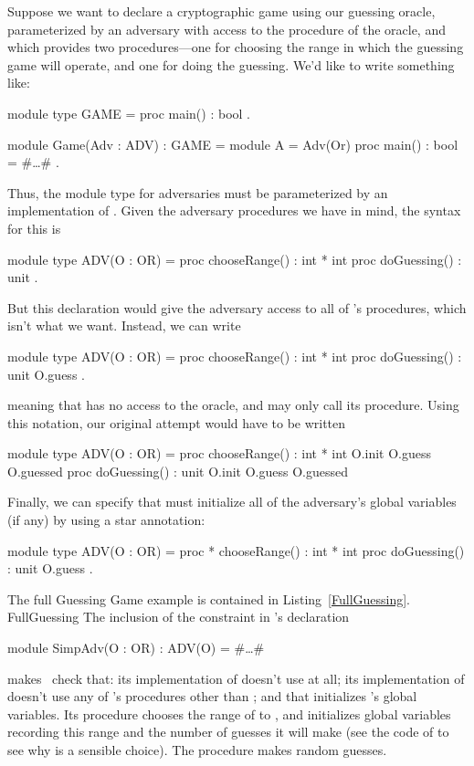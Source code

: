 Suppose we want to declare a cryptographic game using our guessing
oracle, parameterized by an adversary with access to the 
procedure of the oracle, and which provides two procedures---one
for choosing the range in which the guessing game will operate, and
one for doing the guessing.  We'd like to write something like:
\begin{easycrypt}{}{}
module type GAME = {
  proc main() : bool
}.

module Game(Adv : ADV) : GAME = {
  module A = Adv(Or)
  proc main() : bool = { #\ldots# }
}.
\end{easycrypt}
Thus, the module type  for adversaries must be parameterized
by an implementation of . Given the adversary procedures we have
in mind, the syntax for this is
\begin{easycrypt}{}{}
module type ADV(O : OR) = {
  proc chooseRange() : int * int
  proc doGuessing() : unit
}.
\end{easycrypt}
But this declaration would give the adversary access to all of 's
procedures, which isn't what we want. Instead, we can write
\begin{easycrypt}{}{}
module type ADV(O : OR) = {
  proc chooseRange() : int * int {}
  proc doGuessing() : unit {O.guess}
}.
\end{easycrypt}
meaning that  has no access to the oracle, and
 may only call its  procedure. Using
this notation, our original attempt would have to be written
\begin{easycrypt}{}{}
module type ADV(O : OR) = {
  proc chooseRange() : int * int {O.init O.guess O.guessed}
  proc doGuessing() : unit {O.init O.guess O.guessed}
}
\end{easycrypt}
Finally, we can specify that  must initialize
all of the adversary's global variables (if any) by using a
star annotation:
\begin{easycrypt}{}{}
module type ADV(O : OR) = {
  proc * chooseRange() : int * int {}
  proc doGuessing() : unit {O.guess}
}.
\end{easycrypt}

The full Guessing Game example is contained in Listing~\ref{FullGuessing}.
 {}{FullGuessing}
The inclusion of the constraint  in 's declaration
\begin{easycrypt}{}{}
module SimpAdv(O : OR) : ADV(O) = #\ldots#
\end{easycrypt}
makes \EasyCrypt\ check that: its implementation of 
doesn't use  at all; its implementation of 
doesn't use any of 's procedures other than ; and
that  initializes 's global variables.
Its  procedure chooses the range of  to ,
and initializes global variables recording this range and the
number of guesses it will make (see the code of  to see
why  is a sensible choice). The  procedure
makes  random guesses.


